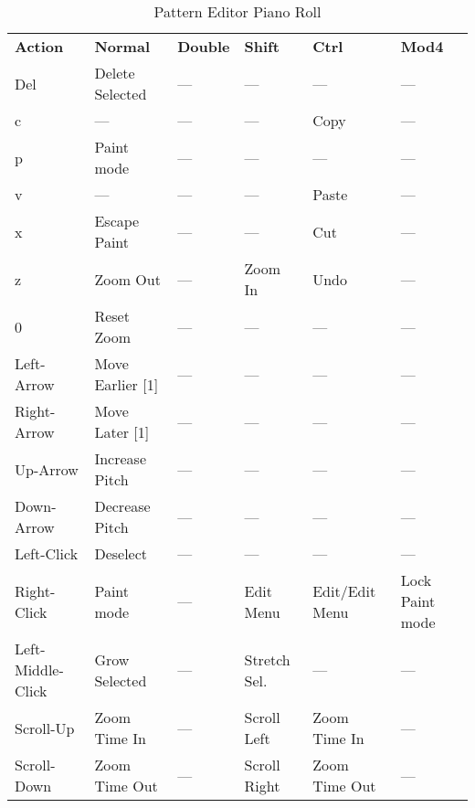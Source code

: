    \begin{table}[H]
      \centering
      \caption{Pattern Editor Piano Roll}
      \label{table:pattern_editor_piano_roll}
      \begin{tabular}{l l l l l l}
         \textbf{Action}   & \textbf{Normal} & \textbf{Double}    & \textbf{Shift} & \textbf{Ctrl}   & \textbf{Mod4}      \\
         Del               & Delete Selected & ---                & ---            & ---             & ---                \\
         c                 & ---             & ---                & ---            & Copy            & ---                \\
         p                 & Paint mode      & ---                & ---            & ---             & ---                \\
         v                 & ---             & ---                & ---            & Paste           & ---                \\
         x                 & Escape Paint    & ---                & ---            & Cut             & ---                \\
         z                 & Zoom Out        & ---                & Zoom In        & Undo            & ---                \\
         0                 & Reset Zoom      & ---                & ---            & ---             & ---                \\
         Left-Arrow        & Move Earlier [1] & ---               & ---            & ---             & ---                \\
         Right-Arrow       & Move Later [1]  & ---                & ---            & ---             & ---                \\
         Up-Arrow          & Increase Pitch  & ---                & ---            & ---             & ---                \\
         Down-Arrow        & Decrease Pitch  & ---                & ---            & ---             & ---                \\
         Left-Click        & Deselect        & ---                & ---            & ---             & ---                \\
         Right-Click       & Paint mode      & ---                & Edit Menu      & Edit/Edit Menu  & Lock Paint mode    \\
         Left-Middle-Click & Grow Selected   & ---                & Stretch Sel.   & ---             & ---                \\
         Scroll-Up         & Zoom Time In    & ---                & Scroll Left    & Zoom Time In    & ---                \\
         Scroll-Down       & Zoom Time Out   & ---                & Scroll Right   & Zoom Time Out   & ---                \\
      \end{tabular}
   \end{table}

